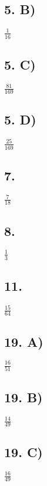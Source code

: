 \documentclass[12]{scrartcl}
\begin{document}
\subsection*{5. B)}
$\frac{1}{16} $
\subsection*{5. C)}
$\frac{81}{169} $
\subsection*{5. D)}
$\frac{25}{169} $

\subsection*{7.}
$\frac{7}{18} $
\subsection*{8.}
$\frac{1}{3} $
\subsection*{11.}
$\frac{15}{64} $
\subsection*{19. A)}
$\frac{16}{51} $
\subsection*{19. B)}
$\frac{14}{49} $
\subsection*{19. C)}
$\frac{16}{49} $
\end{document}
